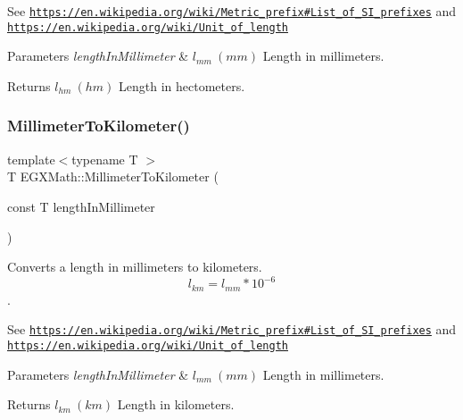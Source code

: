 See \href{https://en.wikipedia.org/wiki/Metric_prefix#List_of_SI_prefixes}{\tt https\+://en.\+wikipedia.\+org/wiki/\+Metric\+\_\+prefix\#\+List\+\_\+of\+\_\+\+S\+I\+\_\+prefixes} and \href{https://en.wikipedia.org/wiki/Unit_of_length}{\tt https\+://en.\+wikipedia.\+org/wiki/\+Unit\+\_\+of\+\_\+length} 
\begin{DoxyParams}{Parameters}
{\em length\+In\+Millimeter} & $ l_{mm}\ (mm)$ Length in millimeters. \\
\hline
\end{DoxyParams}
\begin{DoxyReturn}{Returns}
$ l_{hm}\ (hm)$ Length in hectometers. 
\end{DoxyReturn}
\mbox{\label{group___e_g_x_math-_conversions-_length_conversions-_s_i-_millimeter-_s_i_ga1c5b03f2d0745187350584f77f406f13}} 
\subsubsection{\texorpdfstring{Millimeter\+To\+Kilometer()}{MillimeterToKilometer()}}
{\footnotesize\ttfamily template$<$typename T $>$ \\
T E\+G\+X\+Math\+::\+Millimeter\+To\+Kilometer (\begin{DoxyParamCaption}\item[{const T}]{length\+In\+Millimeter }\end{DoxyParamCaption})}



Converts a length in millimeters to kilometers. \[ l_{km}=l_{mm} * 10^{-6} \]. 

See \href{https://en.wikipedia.org/wiki/Metric_prefix#List_of_SI_prefixes}{\tt https\+://en.\+wikipedia.\+org/wiki/\+Metric\+\_\+prefix\#\+List\+\_\+of\+\_\+\+S\+I\+\_\+prefixes} and \href{https://en.wikipedia.org/wiki/Unit_of_length}{\tt https\+://en.\+wikipedia.\+org/wiki/\+Unit\+\_\+of\+\_\+length} 
\begin{DoxyParams}{Parameters}
{\em length\+In\+Millimeter} & $ l_{mm}\ (mm)$ Length in millimeters. \\
\hline
\end{DoxyParams}
\begin{DoxyReturn}{Returns}
$ l_{km}\ (km)$ Length in kilometers. 
\end{DoxyReturn}
\mbox{\label{group___e_g_x_math-_conversions-_length_conversions-_s_i-_millimeter-_s_i_ga2e4c24dcd2559aebefe78e13fbd0e394}} 
